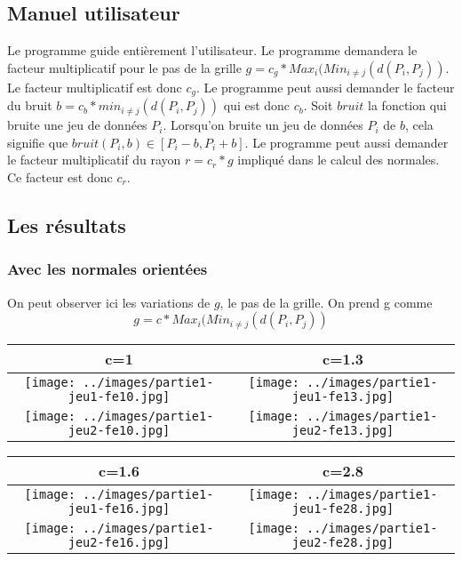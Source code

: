 \documentclass[11pt,a4paper]{article}
\begin{document}
\subsection{Manuel utilisateur}
Le programme guide entièrement l'utilisateur. Le programme demandera le facteur multiplicatif pour le pas de la grille
$g=c_g*Max_i(Min_{i \neq j}(d(P_i,P_j))$. Le facteur multiplicatif est donc $c_g$.
Le programme peut aussi demander le facteur du bruit $b=c_b*min_{i \neq j}(d(P_i,P_j))$ qui est donc $c_b$. Soit $bruit$ la fonction
qui bruite une jeu de données $P_i$. Lorsqu'on bruite un jeu de données $P_i$ de $b$, cela signifie que $bruit(P_i,b) \in [P_i-b, P_i+b]$.
Le programme peut aussi demander le facteur multiplicatif du rayon $r=c_r*g$ impliqué dans le calcul des normales. Ce facteur est donc $c_r$.

\subsection{Les résultats}
\subsubsection{Avec les normales orientées}
On peut observer ici les variations de $g$, le pas de la grille. On prend g comme $$g=c*Max_i(Min_{i \neq j}(d(P_i,P_j))$$

\begin{center}
\begin{tabular}{|c|c|}
\hline
c=1         & c=1.3\\
\hline
\hline
\texttt{[image: ../images/partie1-jeu1-fe10.jpg]} & \texttt{[image: ../images/partie1-jeu1-fe13.jpg]} \\
\hline
\texttt{[image: ../images/partie1-jeu2-fe10.jpg]} & \texttt{[image: ../images/partie1-jeu2-fe13.jpg]} \\
\hline
\end{tabular}

\begin{tabular}{|c|c|}
\hline
c=1.6         & c=2.8\\
\hline
\hline
\texttt{[image: ../images/partie1-jeu1-fe16.jpg]} & \texttt{[image: ../images/partie1-jeu1-fe28.jpg]}\\
\hline
\texttt{[image: ../images/partie1-jeu2-fe16.jpg]} & \texttt{[image: ../images/partie1-jeu2-fe28.jpg]}\\
\hline
\end{tabular}
\end{center}
\end{document}
